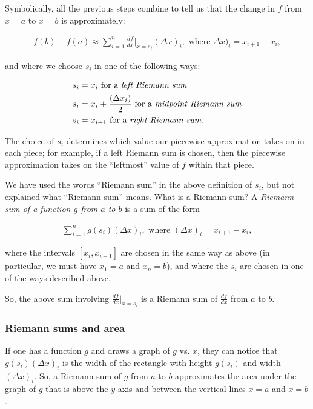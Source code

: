 \documentclass{article}
\begin{document}
Symbolically, all the previous steps combine to tell us that the change in $f$ from $x = a$ to $x = b$ is approximately:
 
\begin{align*}
    f(b) - f(a) \approx \sum_{i = 1}^n \frac{df}{dx}\Big|_{x = s_i} (\Delta x)_i, \text{ where $\Delta x)_i = x_{i + 1} - x_i$},
\end{align*}

and where we choose $s_i$ in one of the following ways:

\begin{align*}
 s_i &= x_i \text{ for a \textit{left Riemann sum}} \\
 s_i &= x_i + \frac{(\Delta x_i)}{2} \text{ for a \textit{midpoint Riemann sum}} \\
 s_i &= x_{i + 1} \text{ for a \textit{right Riemann sum}}.
\end{align*}

The choice of $s_i$ determines which value our piecewise approximation takes on in each piece; for example, if a left Riemann sum is chosen, then the piecewise approximation takes on the ``leftmost'' value of $f$ within that piece.

We have used the words ``Riemann sum'' in the above definition of $s_i$, but not explained what ``Riemann sum'' means. What is a Riemann sum? A \textit{Riemann sum of a function $g$ from $a$ to $b$} is a sum of the form

\begin{align*}
    \sum_{i = 1}^n g(s_i) (\Delta x)_i, \text{ where $(\Delta x)_i = x_{i + 1} - x_i$},
\end{align*}

where the intervals $[x_i, x_{i + 1}]$ are chosen in the same way as above (in particular, we must have $x_1 = a$ and $x_n = b$), and where the $s_i$ are chosen in one of the ways described above.

So, the above sum involving $\frac{df}{dx}\Big|_{x = s_i}$ is a Riemann sum of $\frac{df}{dx}$ from $a$ to $b$.

\subsubsection*{Riemann sums and area}

If one has a function $g$ and draws a graph of $g$ vs. $x$, they can notice that $g(s_i) (\Delta x)_i$ is the width of the rectangle with height $g(s_i)$ and width $(\Delta x)_i$. So, a Riemann sum of $g$ from $a$ to $b$ approximates the area under the graph of $g$ that is above the $y$-axis and between the vertical lines $x = a$ and $x = b$.
\end{document}
